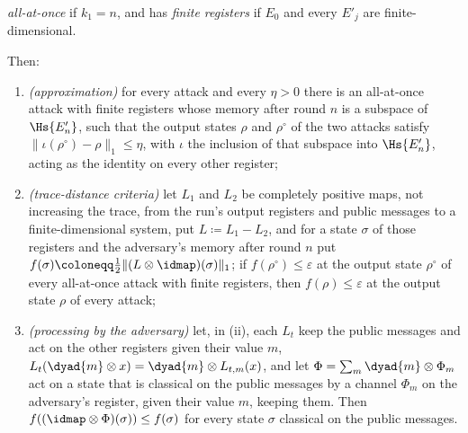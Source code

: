 \begin{lemma}
\begin{enumerate}[label=(\alph*),leftmargin=2.4em]
  \emph{all-at-once} if $k_1=n$, and has \emph{finite registers} if $E_0$ and
  every $E'_j$ are finite-dimensional.
\end{enumerate}
Then:
\begin{enumerate}[label=(\roman*),leftmargin=2.4em]
\item \emph{(approximation)} for every attack and every $\eta>0$ there is an
  all-at-once attack with finite registers whose memory after round $n$ is a
  subspace of $\Hs{E'_n}$, such that the output states $\rho$ and
  $\rho^{\circ}$ of the two attacks satisfy
  $\|\iota(\rho^{\circ})-\rho\|_1\le\eta$, with $\iota$ the inclusion of that
  subspace into $\Hs{E'_n}$, acting as the identity on every other register;
\item \emph{(trace-distance criteria)} let $L_1$ and $L_2$ be completely
  positive maps, not increasing the trace, from the run's output registers
  and public messages to a finite-dimensional system, put $L\coloneqq
  L_1-L_2$, and for a state $\sigma$ of those registers and the adversary's
  memory after round $n$ put
  $f(\sigma)\coloneqq\frac12\|(L\otimes\idmap)(\sigma)\|_1$; if
  $f(\rho^{\circ})\le\varepsilon$ at the output state $\rho^{\circ}$ of every
  all-at-once attack with finite registers, then $f(\rho)\le\varepsilon$ at
  the output state $\rho$ of every attack;
\item \emph{(processing by the adversary)} let, in (ii), each $L_t$ keep the
  public messages and act on the other registers given their value $m$,
  $L_t(\dyad{m}\otimes x)=\dyad{m}\otimes L_{t,m}(x)$, and let
  $\Phi=\sum_m\dyad{m}\otimes\Phi_m$ act on a state that is classical on the
  public messages by a channel $\Phi_m$ on the adversary's register, given
  their value $m$, keeping them. Then $f((\idmap\otimes\Phi)(\sigma))\le
  f(\sigma)$ for every state $\sigma$ classical on the public messages.
\end{enumerate}
\end{lemma}

